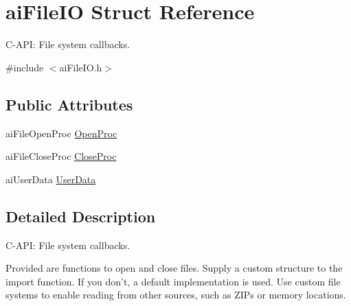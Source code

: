 \hypertarget{structai_file_i_o}{\section{ai\-File\-I\-O Struct Reference}
\label{structai_file_i_o}
}


C-\/\-A\-P\-I\-: File system callbacks.  




{\ttfamily \#include $<$ai\-File\-I\-O.\-h$>$}

\subsection*{Public Attributes}
\begin{DoxyCompactItemize}
\item 
ai\-File\-Open\-Proc \hyperlink{structai_file_i_o_a819d9c7823039294125068d06949a6df}{Open\-Proc}
\item 
ai\-File\-Close\-Proc \hyperlink{structai_file_i_o_a7ec702672712b5a02dc49cb17f980a14}{Close\-Proc}
\item 
ai\-User\-Data \hyperlink{structai_file_i_o_a9c62b7f3d70fbb2f41e33ad0b9933139}{User\-Data}
\end{DoxyCompactItemize}


\subsection{Detailed Description}
C-\/\-A\-P\-I\-: File system callbacks. 

Provided are functions to open and close files. Supply a custom structure to the import function. If you don't, a default implementation is used. Use custom file systems to enable reading from other sources, such as Z\-I\-Ps or memory locations. 

